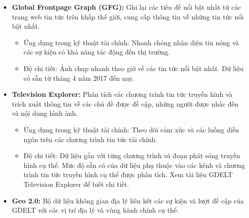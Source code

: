 \begin{itemize}
  \begin{itemize}
    \item
    Ứng dụng trong kỹ thuật tài chính:

    \begin{itemize}
        \item
      Theo dõi mức độ đưa tin và nhận diện các thực thể liên quan đến từng công ty cụ thể.
    \item
      Đánh giá cảm xúc và nhận thức của công chúng đối với các công ty.
    \end{itemize}
  \item
    Độ chi tiết: Dữ liệu ở cấp độ lượt đề cập, cung cấp thông tin về tần suất và ngữ cảnh của các lượt đề cập thực thể. Dữ liệu có sẵn từ tháng 2 năm 2015 đến nay.
  \end{itemize}
\item
  \textbf{Global Frontpage Graph (GFG):} Ghi lại các tiêu đề nổi bật nhất từ các trang web tin tức trên khắp thế giới, cung cấp thông tin về những tin tức nổi bật nhất.

  \begin{itemize}
    \item
    Ứng dụng trong kỹ thuật tài chính: Nhanh chóng nhận diện tin nóng và các sự kiện có khả năng tác động đến thị trường.
  \item
    Độ chi tiết: Ảnh chụp nhanh theo giờ về các tin tức nổi bật nhất. Dữ liệu có sẵn từ tháng 4 năm 2017 đến nay.
  \end{itemize}
\item
  \textbf{Television Explorer:} Phân tích các chương trình tin tức truyền hình và trích xuất thông tin về các chủ đề được đề cập, những người được nhắc đến và nội dung hình ảnh.

  \begin{itemize}
    \item
    Ứng dụng trong kỹ thuật tài chính: Theo dõi cảm xúc và các luồng diễn ngôn trên các chương trình tin tức tài chính.
  \item
    Độ chi tiết: Dữ liệu gắn với từng chương trình và đoạn phát sóng truyền hình cụ thể. Mức độ sẵn có của dữ liệu phụ thuộc vào các kênh và chương trình tin tức truyền hình cụ thể được phân tích. Xem tài liệu GDELT Television Explorer để biết chi tiết.
  \end{itemize}
\item
  \textbf{Geo 2.0:} Bộ dữ liệu không gian địa lý liên kết các sự kiện và lượt đề cập của GDELT với các vị trí địa lý và vùng hành chính cụ thể.


\end{itemize}
